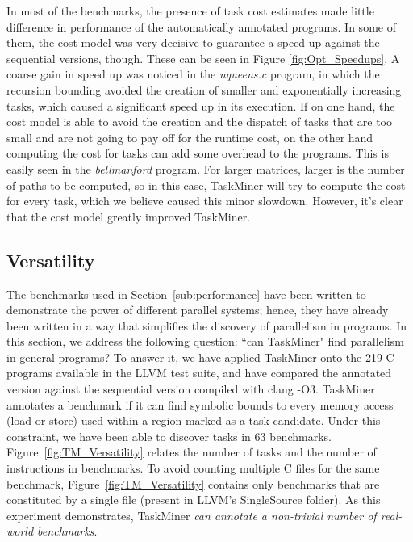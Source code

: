 \documentclass[sigplan,10pt,review,anonymous]{acmart}
\newcommand\Taskminer{\mbox{\textsf{TaskMiner}}}
\begin{document}
In most of the benchmarks, the presence of task cost estimates made little difference in performance of
the automatically annotated programs. In some of them, the cost model was very decisive to 
guarantee a speed up against the sequential versions, though. These can be seen in Figure \ref{fig:Opt_Speedups}.
A coarse gain in speed up was noticed in the \textit{nqueens.c} program, in which the recursion bounding
avoided the creation of smaller and exponentially increasing tasks, which caused a significant speed
up in its execution. 
If on one hand, the cost model is able to avoid the creation and the dispatch of tasks that are too small
and are not going to pay off for the runtime cost, on the other hand computing the cost for tasks can add
some overhead to the programs. This is easily seen in the \textit{bellmanford} program. For larger
matrices, larger is the number of paths to be computed, so in this case, {\Taskminer} will try to
compute the cost for every task, which we believe caused this minor slowdown. However, it's
clear that the cost model greatly improved {\Taskminer}.


\subsection{Versatility}
\label{sub:versatility}

The benchmarks used in Section~\ref{sub:performance} have been written to
demonstrate the power of different parallel systems; hence, they have already
been written in a way that simplifies the discovery of parallelism in programs.
In this section, we address the following question: ``can \Taskminer" find
parallelism in general programs?
To answer it, we have applied \Taskminer{} onto the 219 C programs available in
the LLVM test suite, and have compared the annotated version
against the sequential version compiled with \textsf{clang} -O3.
\Taskminer{} annotates a benchmark if it can find symbolic bounds to every
memory access (load or store) used within a region marked as a task candidate.
Under this constraint, we have been able to discover tasks in 63 benchmarks.
Figure~\ref{fig:TM_Versatility} relates the number of tasks and the number of
instructions in benchmarks.
To avoid counting multiple C files for the same benchmark,
Figure~\ref{fig:TM_Versatility} contains only benchmarks that are
constituted by a single file (present in LLVM's \textsf{SingleSource} folder).
As this experiment demonstrates, \Taskminer{} {\em can annotate a non-trivial
number of real-world benchmarks}.
\end{document}
